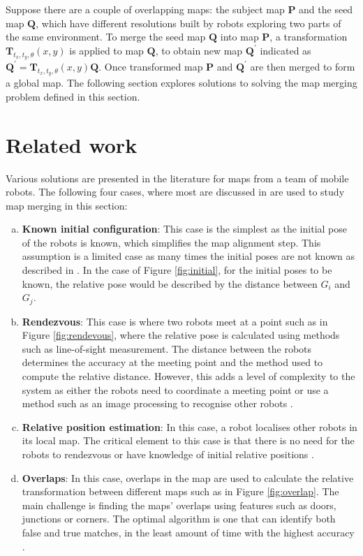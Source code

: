 Suppose there are a couple of overlapping maps: the subject map $\mathbf{P}$ and the seed map $\mathbf{Q}$, which have different resolutions built by robots exploring two parts of the same environment. To merge the seed map $\mathbf{Q}$ into map $\mathbf{P}$, a transformation $\mathbf{T}_{t_x, t_y, \theta}(x, y)$ is applied to map $\mathbf{Q}$, to obtain new map $\mathbf{Q}^{'}$ indicated as $\mathbf{Q}^{'} = \mathbf{T}_{t_x, t_y, \theta}(x, y) \mathbf{Q}$. Once transformed map $\mathbf{P}$ and $\mathbf{Q}^{'}$ are then merged to form a global map. The following section explores solutions to solving the map merging problem defined in this section. 

\section{Related work}

Various solutions are presented in the literature for maps from a team of mobile robots. The following four cases, where most are discussed in \cite{Rone2013} are used to study map merging in this section:
 
\begin{enumerate}[a.]
	\item \textbf{Known initial configuration}: This case is the simplest as the initial pose of the robots is known, which simplifies the map alignment step. This assumption is a limited case as many times the initial poses are not known as described in \cite{Carlone2010a}. In the case of Figure \ref{fig:initial}, for the initial poses to be known, the relative pose would be described by the distance between $G_i$ and $G_j$.
	\item \textbf{Rendezvous}: This case is where two robots meet at a point such as in Figure \ref{fig:rendevous}, where the relative pose is calculated using methods such as line-of-sight measurement. The distance between the robots determines the accuracy at the meeting point and the method used to compute the relative distance. However, this adds a level of complexity to the system as either the robots need to coordinate a meeting point or use a method such as an image processing to recognise other robots \cite{4058636}.
	\item \textbf{Relative position estimation}: In this case, a robot localises other robots in its local map. The critical element to this case is that there is no need for the robots to rendezvous or have knowledge of initial relative positions \cite{1249654}.
	\item \textbf{Overlaps}: In this case, overlaps in the map are used to calculate the relative transformation between different maps such as in Figure \ref{fig:overlap}. The main challenge is finding the maps' overlaps using features such as doors, junctions or corners. The optimal algorithm is one that can identify both false and true matches, in the least amount of time with the highest accuracy \cite{Birk2006}.
\end{enumerate}

